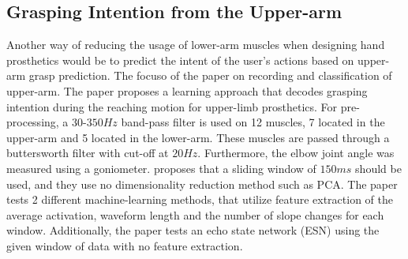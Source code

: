 \documentclass[../main.tex]{subfiles}
\begin{document}
\subsection{Grasping Intention from the Upper-arm}

Another way of reducing the usage of lower-arm muscles when designing hand prosthetics would be to predict the intent of the user's actions based on upper-arm grasp prediction.
The focuso of the paper \cite{Batzianoulis2018} on recording and classification of upper-arm.
The paper proposes a learning approach that decodes grasping intention during the reaching motion for upper-limb prosthetics.
For pre-processing, a $30$-$350Hz$ band-pass filter is used on 12 muscles, 7 located in the upper-arm and 5 located in the lower-arm.
These muscles are passed through a buttersworth filter with cut-off at $20Hz$.
Furthermore, the elbow joint angle was measured using a goniometer.
\cite{Batzianoulis2018} proposes that a sliding window of $150ms$ should be used, and they use no dimensionality reduction method such as PCA.
The paper tests 2 different machine-learning methods, that utilize feature extraction of the average activation, waveform length and the number of slope changes for each window.
Additionally, the paper tests an echo state network (ESN) using the given window of data with no feature extraction.






\end{document}
